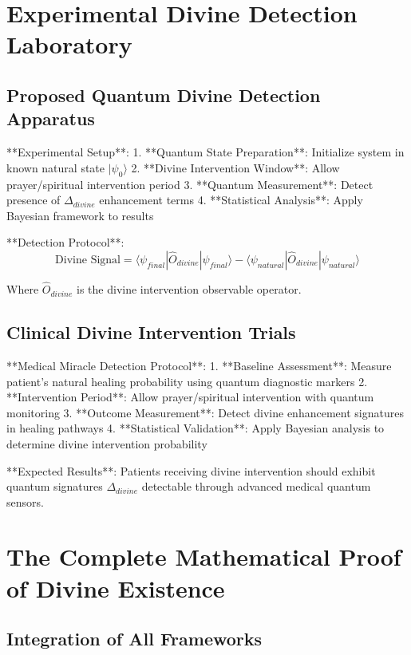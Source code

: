 \documentclass[12pt,a4paper]{article}
\begin{document}
\section{Experimental Divine Detection Laboratory}

\subsection{Proposed Quantum Divine Detection Apparatus}

**Experimental Setup**:
1. **Quantum State Preparation**: Initialize system in known natural state $|\psi_0\rangle$
2. **Divine Intervention Window**: Allow prayer/spiritual intervention period
3. **Quantum Measurement**: Detect presence of $\Delta_{divine}$ enhancement terms
4. **Statistical Analysis**: Apply Bayesian framework to results

**Detection Protocol**:
$$\text{Divine Signal} = \langle \psi_{final} | \hat{O}_{divine} | \psi_{final} \rangle - \langle \psi_{natural} | \hat{O}_{divine} | \psi_{natural} \rangle$$

Where $\hat{O}_{divine}$ is the divine intervention observable operator.

\subsection{Clinical Divine Intervention Trials}

**Medical Miracle Detection Protocol**:
1. **Baseline Assessment**: Measure patient's natural healing probability using quantum diagnostic markers
2. **Intervention Period**: Allow prayer/spiritual intervention with quantum monitoring
3. **Outcome Measurement**: Detect divine enhancement signatures in healing pathways
4. **Statistical Validation**: Apply Bayesian analysis to determine divine intervention probability

**Expected Results**: Patients receiving divine intervention should exhibit quantum signatures $\Delta_{divine}$ detectable through advanced medical quantum sensors.

\section{The Complete Mathematical Proof of Divine Existence}

\subsection{Integration of All Frameworks}
\end{document}
